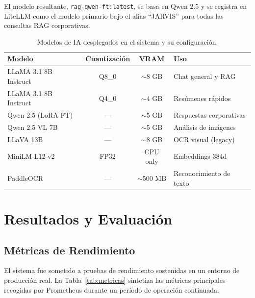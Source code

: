 El modelo resultante, \texttt{rag-qwen-ft:latest}, se basa en Qwen 2.5 y se registra en LiteLLM como el modelo primario bajo el alias ``JARVIS'' para todas las consultas RAG corporativas.

\begin{table}[H]
\centering
\caption{Modelos de IA desplegados en el sistema y su configuración.}
\label{tab:modelos-ia}
\begin{tabular}{lccl}
\toprule
\textbf{Modelo} & \textbf{Cuantización} & \textbf{VRAM} & \textbf{Uso} \\
\midrule
LLaMA 3.1 8B Instruct & Q8\_0 & $\sim$8 GB & Chat general y RAG \\
LLaMA 3.1 8B Instruct & Q4\_0 & $\sim$4 GB & Resúmenes rápidos \\
Qwen 2.5 (LoRA FT)    & --- & $\sim$5 GB & Respuestas corporativas \\
Qwen 2.5 VL 7B        & --- & $\sim$5 GB & Análisis de imágenes \\
LLaVA 13B             & --- & $\sim$8 GB & OCR visual (legacy) \\
MiniLM-L12-v2          & FP32 & CPU only & Embeddings 384d \\
PaddleOCR              & --- & $\sim$500 MB & Reconocimiento de texto \\
\bottomrule
\end{tabular}
\end{table}

\section{Resultados y Evaluación}

\subsection{Métricas de Rendimiento}
El sistema fue sometido a pruebas de rendimiento sostenidas en un entorno de producción real. La Tabla~\ref{tab:metricas} sintetiza las métricas principales recogidas por Prometheus durante un período de operación continuada.

